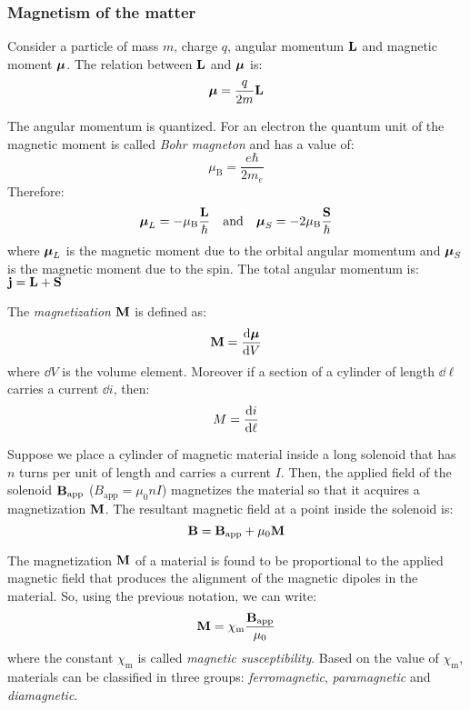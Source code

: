 \documentclass[../../../main.tex]{subfiles}
\begin{document}
\begin{multicols}{2}
    \subsubsection*{Magnetism of the matter}
    \begin{prop}
        Consider a particle of mass $m$, charge $q$, angular momentum $\boldsymbol{\mathrm{L}}$ and magnetic moment $\vb*{\mu}$. The relation between $\boldsymbol{\mathrm{L}}$ and $\vb*{\mu}$ is: $$\vb*{\mu}=\frac{q}{2m}\boldsymbol{\mathrm{L}}$$
    \end{prop}
    \begin{prop}
        The angular momentum is quantized. For an electron the quantum unit of the magnetic moment is called \textit{Bohr magneton} and has a value of: $$\mu_\text{B}=\frac{e\hbar}{2m_e}$$ Therefore: $$\vb*{\mu}_L=-\mu_\text{B}\frac{\boldsymbol{\mathrm{L}}}{\hbar}\quad\text{and}\quad\vb*{\mu}_S=-2\mu_\text{B}\frac{\boldsymbol{\mathrm{S}}}{\hbar}$$ where $\vb*{\mu}_L$ is the magnetic moment due to the orbital angular momentum and $\vb*{\mu}_S$ is the magnetic moment due to the spin. The total angular momentum is: $\boldsymbol{\mathrm{j}}=\boldsymbol{\mathrm{L}}+\boldsymbol{\mathrm{S}}$
    \end{prop}
    \begin{definition}
        The \textit{magnetization $\boldsymbol{\mathrm{M}}$} is defined as: $$\boldsymbol{\mathrm{M}}=\dv{\vb*{\mu}}{V}$$ where $\dd V$ is the volume element. Moreover if a section of a cylinder of length $\dd\ell$ carries a current $\dd i$, then: $$M=\dv{i}{\ell}$$
    \end{definition}
    \begin{prop}
        Suppose we place a cylinder of magnetic material inside a long solenoid that has $n$ turns per unit of length and carries a current $I$. Then, the applied field of the solenoid $\boldsymbol{\mathrm{B}}_\text{app}$ ($B_\text{app}=\mu_0nI$) magnetizes the material so that it acquires a magnetization $\boldsymbol{\mathrm{M}}$. The resultant magnetic field at a point inside the solenoid is: $$\boldsymbol{\mathrm{B}}=\boldsymbol{\mathrm{B}}_\text{app}+\mu_0\boldsymbol{\mathrm{M}}$$
    \end{prop}
    \begin{prop}
        The magnetization $\boldsymbol{\mathrm{M}}$ of a material is found to be proportional to the applied magnetic field that produces the alignment of the magnetic dipoles in the material. So, using the previous notation, we can write: $$\boldsymbol{\mathrm{M}}=\chi_\text{m}\frac{\boldsymbol{\mathrm{B}}_\text{app}}{\mu_0}$$ where the constant $\chi_\text{m}$ is called \textit{magnetic susceptibility}. Based on the value of $\chi_\text{m}$, materials can be classified in three groups: \textit{ferromagnetic}, \textit{paramagnetic} and \textit{diamagnetic}.

\end{prop}
\end{multicols}
\end{document}
